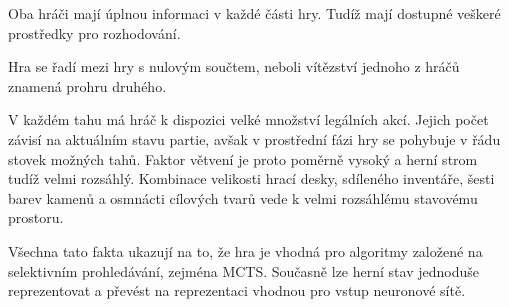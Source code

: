 Oba hráči mají úplnou informaci v každé části hry. Tudíž mají dostupné veškeré prostředky pro rozhodování.

Hra se řadí mezi hry s nulovým součtem, neboli vítězství jednoho z hráčů znamená prohru druhého.

V každém tahu má hráč k dispozici velké množství legálních akcí. Jejich počet závisí na aktuálním stavu partie, 
avšak v prostřední fázi hry se pohybuje v řádu stovek možných tahů. Faktor větvení je proto poměrně vysoký a herní strom tudíž velmi rozsáhlý.
Kombinace velikosti hrací desky, sdíleného inventáře, šesti barev kamenů a osmnácti cílových tvarů vede k velmi rozsáhlému stavovému prostoru.

Všechna tato fakta ukazují na to, že hra je vhodná pro algoritmy založené na selektivním prohledávání, zejména MCTS. 
Současně lze herní stav jednoduše reprezentovat a převést na reprezentaci vhodnou pro vstup neuronové sítě.